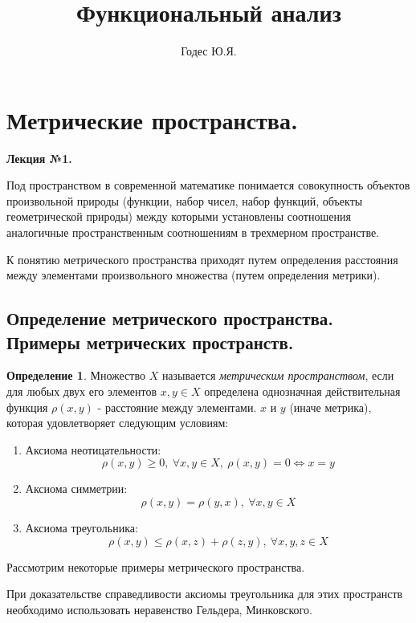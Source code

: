 \documentclass[14pt,a4paper]{extarticle}
\title{\textbf{Функциональный анализ}}
\author{Годес Ю.Я.}
\date{}
\theoremstyle{definition}
\newtheorem{definition}{Определение}[section]
\theoremstyle{remark}
\renewcommand{\[}{\begin{dmath*}[compact]}
\renewcommand{\]}{\end{dmath*}}
\newcommand{\be}{\begin{enumerate}}
\newcommand{\ee}{\end{enumerate}}
\newcommand{\sep}{ , \ \allowbreak }
\begin{document}
\sloppy
\maketitle

\tableofcontents

\section{Метрические пространства.} \label{sec:mp}

\textbf{Лекция №1.}

Под пространством в современной математике понимается совокупность объектов
произвольной природы (функции, набор чисел, набор функций, объекты
геометрической природы) между которыми установлены соотношения аналогичные
пространственным соотношениям в трехмерном пространстве.

К понятию метрического пространства приходят путем определения расстояния между
элементами произвольного множества (путем определения метрики).

\subsection{Определение метрического пространства.
Примеры метрических пространств.}

\begin{definition}
  Множество $X$ называется \textit{метрическим пространством},
  если для любых двух его элементов $x, y \in X$
  определена однозначная действительная функция
  $\rho(x, y)$ - расстояние между элементами.
  $x$ и $y$ (иначе метрика), которая удовлетворяет следующим условиям:

  \be
    \item Аксиома неотицательности:
    \[ {\rho(x, y) \geq 0} \sep {\forall x, y \in X} \sep
    {\rho(x, y) = 0} \Leftrightarrow {x = y} \]
    \item Аксиома симметрии:
    \[{\rho(x, y) = \rho(y, x)} \sep {\forall x, y \in X}\]
    \item Аксиома треугольника:
    \[\rho(x, y) \leq {\rho(x, z) + \rho(z, y)} \sep
    {\forall x, y, z \in X}\]
  \ee
\end{definition}

Рассмотрим некоторые примеры метрического пространства.

При доказательстве справедливости аксиомы треугольника для этих пространств
необходимо использовать неравенство Гельдера, Минковского.
\end{document}

